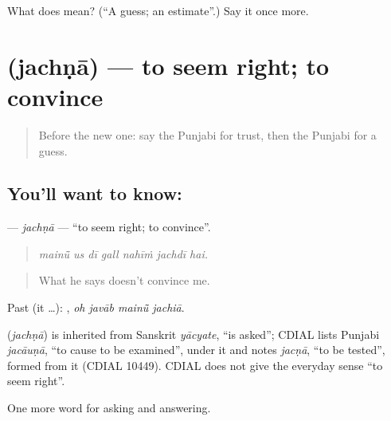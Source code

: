 \begin{tcolorbox}[breakable,colback=teal!4,colframe=teal!35!black,title={Before you move on}]
What does  mean? (\textquotedblleft{}A guess; an estimate\textquotedblright{}.) Say it once more.
\end{tcolorbox}
\section[\texorpdfstring{\pa{ਜਚਣਾ} (jachṇā)}{ਜਚਣਾ (jachṇā)}]{ (jachṇā) — to seem right; to convince}

\label{lesson:PA-C341-jachna}



\begin{quote}
Before the new one: say the Punjabi for trust, then the Punjabi for a guess.
\end{quote}

\subsection*{You'll want to know: }
\textbf{} — \emph{jachṇā} — \textquotedblleft{}to seem right; to convince\textquotedblright{}.

\begin{quote}
      
\end{quote}

\begin{quote}
\emph{mainū̃ us dī gall nahīṁ jachdī hai.}
\end{quote}

\begin{quote}
What he says doesn't convince me.
\end{quote}

Past (it …):    , \emph{oh javāb mainū̃ jachiā}.

\begin{cousinweb}
\textbf{} (\emph{jachṇā}) is inherited from Sanskrit \emph{yācyate}, \textquotedblleft{}is asked\textquotedblright{}; CDIAL lists Punjabi \emph{jacāuṇā}, \textquotedblleft{}to cause to be examined\textquotedblright{}, under it and notes \emph{jacṇā}, \textquotedblleft{}to be tested\textquotedblright{}, formed from it (CDIAL 10449). CDIAL does not give the everyday sense \textquotedblleft{}to seem right\textquotedblright{}.
\end{cousinweb}

\begin{grammarlens}[title={What you've built}]
One more word for asking and answering.
\end{grammarlens}

